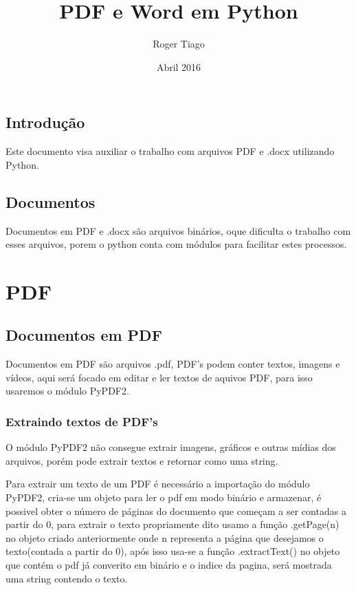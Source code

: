 \documentclass[12pt,a4paper,article]{report}
\author{Roger Tiago }
\date{Abril 2016}
\title{PDF e Word em Python}
\begin{document}
\maketitle



\newpage

\dominitoc
\tableofcontents

\newpage

\section{Introdução}
     Este documento visa auxiliar o trabalho com arquivos PDF e .docx utilizando Python.
    
\section{Documentos}
     Documentos em PDF e .docx são arquivos binários, oque dificulta o trabalho com esses arquivos, porem o python conta com módulos para facilitar estes processos.
\chapter{PDF} \label{Trabalhando com PDF}
\section{Documentos em PDF}
     Documentos em PDF são arquivos .pdf, PDF's podem conter textos, imagens e vídeos, aqui será focado em editar e ler textos de aquivos PDF, para isso usaremos o módulo PyPDF2.
    
\subsection{Extraindo textos de PDF's}
     O módulo PyPDF2 não consegue extrair imagens, gráficos e outras mídias dos arquivos, porém pode extrair textos e retornar como uma string.\par
     Para extrair um texto de um PDF é necessário a importação do módulo PyPDF2, cria-se um objeto para ler o pdf em modo binário e armazenar, é possivel obter o número de páginas do documento que começam a ser contadas a partir do 0, para extrair o texto propriamente dito usamo a função .getPage(n) no objeto criado anteriormente onde n representa a página que desejamos o texto(contada a partir do 0), após isso usa-se a função .extractText() no objeto que contém o pdf já converito em binário e o indice da pagina, será mostrada uma string contendo o texto. 
     
\end{document}
